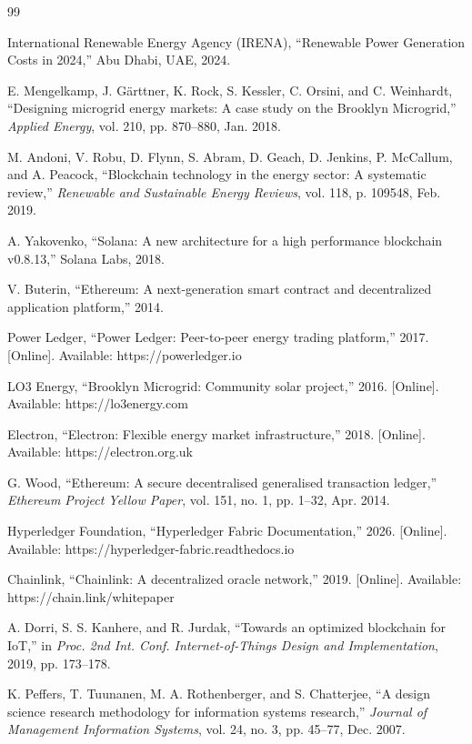 \documentclass[conference]{IEEEtran}
\begin{document}
\begin{thebibliography}{99}

International Renewable Energy Agency (IRENA), ``Renewable Power Generation Costs in 2024,'' Abu Dhabi, UAE, 2024.

E. Mengelkamp, J. G\"{a}rttner, K. Rock, S. Kessler, C. Orsini, and C. Weinhardt, ``Designing microgrid energy markets: A case study on the Brooklyn Microgrid,'' \emph{Applied Energy}, vol. 210, pp. 870--880, Jan. 2018.

M. Andoni, V. Robu, D. Flynn, S. Abram, D. Geach, D. Jenkins, P. McCallum, and A. Peacock, ``Blockchain technology in the energy sector: A systematic review,'' \emph{Renewable and Sustainable Energy Reviews}, vol. 118, p. 109548, Feb. 2019.

A. Yakovenko, ``Solana: A new architecture for a high performance blockchain v0.8.13,'' Solana Labs, 2018.

V. Buterin, ``Ethereum: A next-generation smart contract and decentralized application platform,'' 2014.

Power Ledger, ``Power Ledger: Peer-to-peer energy trading platform,'' 2017. [Online]. Available: https://powerledger.io

LO3 Energy, ``Brooklyn Microgrid: Community solar project,'' 2016. [Online]. Available: https://lo3energy.com

Electron, ``Electron: Flexible energy market infrastructure,'' 2018. [Online]. Available: https://electron.org.uk

G. Wood, ``Ethereum: A secure decentralised generalised transaction ledger,'' \emph{Ethereum Project Yellow Paper}, vol. 151, no. 1, pp. 1--32, Apr. 2014.

Hyperledger Foundation, ``Hyperledger Fabric Documentation,'' 2026. [Online]. Available: https://hyperledger-fabric.readthedocs.io

Chainlink, ``Chainlink: A decentralized oracle network,'' 2019. [Online]. Available: https://chain.link/whitepaper

A. Dorri, S. S. Kanhere, and R. Jurdak, ``Towards an optimized blockchain for IoT,'' in \emph{Proc. 2nd Int. Conf. Internet-of-Things Design and Implementation}, 2019, pp. 173--178.

K. Peffers, T. Tuunanen, M. A. Rothenberger, and S. Chatterjee, ``A design science research methodology for information systems research,'' \emph{Journal of Management Information Systems}, vol. 24, no. 3, pp. 45--77, Dec. 2007.


\end{thebibliography}
\end{document}
